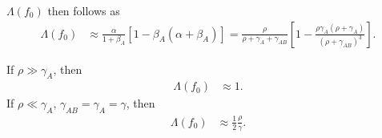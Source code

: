 \documentclass[11pt]{article}
\begin{document}
$\Lambda(f_0)$ then follows as
\begin{align}\label{eq:lambda_strong_s_neutral}
    \Lambda(f_0) &\approx \frac{\alpha}{1+\beta_A} 
     \left[1 -  \beta_A(\alpha+\beta_A)\right] = \frac{\rho}{\rho + \gamma_A + \gamma_{AB}} \left[1 -\frac{\rho\gamma_A(\rho + \gamma_{A})}{(\rho+\gamma_{AB})^3}\right].
\end{align}

If $\rho \gg \gamma_A$, then 
\begin{align}
    \Lambda(f_0) &\approx 1.
\end{align}
If $\rho \ll \gamma_A$, $\gamma_{AB}=\gamma_A = \gamma$, then
\begin{align}
    \Lambda(f_0) &\approx \frac{1}{2}\frac{\rho}{\gamma}.
\end{align} 


\end{document}
